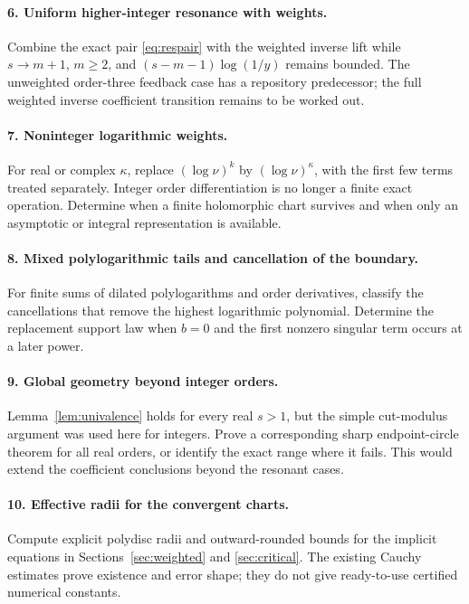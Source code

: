 \documentclass[11pt,a4paper]{article}
\numberwithin{equation}{section}
\theoremstyle{definition}
\theoremstyle{remark}
\begin{document}
\paragraph{6. Uniform higher-integer resonance with weights.}
Combine the exact pair \eqref{eq:respair} with the weighted inverse
lift while \(s\to m+1\), \(m\ge2\), and
\((s-m-1)\log(1/y)\) remains bounded.
The unweighted order-three feedback case has a repository predecessor;
the full weighted inverse coefficient transition remains to be worked out.

\paragraph{7. Noninteger logarithmic weights.}
For real or complex \(\kappa\), replace \((\log\nu)^k\) by
\((\log\nu)^\kappa\), with the first few terms treated separately.
Integer order differentiation is no longer a finite exact operation.
Determine when a finite holomorphic chart survives and when only an
asymptotic or integral representation is available.

\paragraph{8. Mixed polylogarithmic tails and cancellation of the boundary.}
For finite sums of dilated polylogarithms and order derivatives,
classify the cancellations that remove the highest logarithmic
polynomial.  Determine the replacement support law when \(b=0\) and
the first nonzero singular term occurs at a later power.

\paragraph{9. Global geometry beyond integer orders.}
Lemma~\ref{lem:univalence} holds for every real \(s>1\), but the
simple cut-modulus argument was used here for integers.
Prove a corresponding sharp endpoint-circle theorem for all real
orders, or identify the exact range where it fails.
This would extend the coefficient conclusions beyond the resonant cases.

\paragraph{10. Effective radii for the convergent charts.}
Compute explicit polydisc radii and outward-rounded bounds for the
implicit equations in Sections~\ref{sec:weighted} and
\ref{sec:critical}.  The existing Cauchy estimates prove existence
and error shape; they do not give ready-to-use certified numerical
constants.
\end{document}
